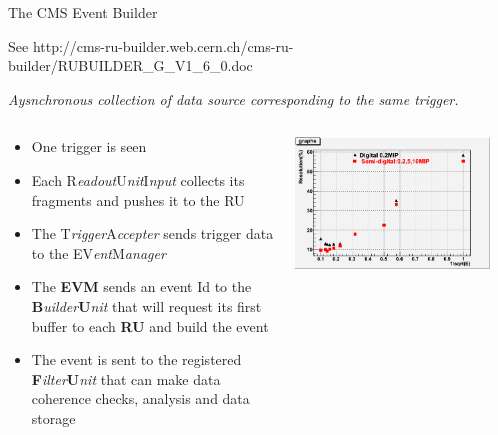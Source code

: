 \begin{frame}[shrink=5]{The CMS Event Builder}

  See {\tiny http://cms-ru-builder.web.cern.ch/cms-ru-builder/RUBUILDER\_G\_V1\_6\_0.doc}



  {\sl Aysnchronous collection of data source corresponding to the same trigger.}

  \bigskip
  \begin{columns}
    \begin{column}{0.5\textwidth}
      \begin{itemize}
      \item {\small One trigger is seen}
      \item {\small Each R{\sl eadout}U{\sl nit}I{\sl nput} collects its fragments and pushes it to the RU}
      \item {\small The T{\sl rigger}A{\sl ccepter} sends trigger data to the EV{\sl ent}M{\sl anager} }
      \item {\small The {\bf EVM} sends an event Id to the {\bf B}{\sl uilder}{\bf U}{\sl nit} that will request its first buffer to each {\bf RU} and build the event}
      \item {\small The event is sent to the registered {\bf F}{\sl ilter}{\bf U}{\sl nit} that can make data coherence checks, analysis and data storage}
      \end{itemize}
    \end{column}

    \begin{column}{0.65\textwidth}
      \centerline{\includegraphics[width=0.9\textwidth]{images/DigitalSemiDigital}}
    \end{column}
  \end{columns}
\end{frame}

